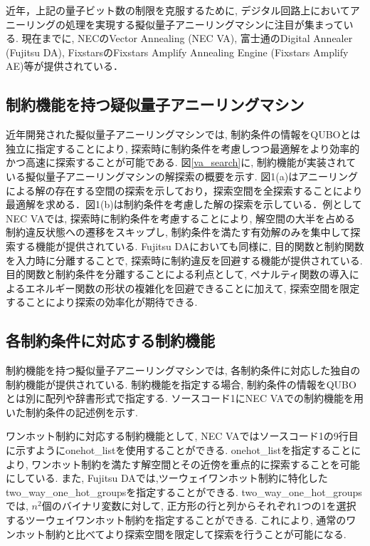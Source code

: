 \documentclass[submit,techrep,noauthor]{ipsj}
\begin{document}
近年，上記の量子ビット数の制限を克服するために, デジタル回路上においてアニーリングの処理を実現する擬似量子アニーリングマシンに注目が集まっている. 現在までに, NECのVector Annealing (NEC VA)\cite{va}, 富士通のDigital Annealer (Fujitsu DA)\cite{da}, FixstarsのFixstars Amplify Annealing Engine (Fixstars Amplify AE)\cite{amplify}等が提供されている．

\subsection{制約機能を持つ疑似量子アニーリングマシン}
近年開発された擬似量子アニーリングマシンでは, 制約条件の情報をQUBOとは独立に指定することにより, 探索時に制約条件を考慮しつつ最適解をより効率的かつ高速に探索することが可能である. 図\ref{va_search}に, 制約機能が実装されている擬似量子アニーリングマシンの解探索の概要を示す. 図1(a)はアニーリングによる解の存在する空間の探索を示しており，探索空間を全探索することにより最適解を求める．図1(b)は制約条件を考慮した解の探索を示している．例としてNEC VAでは, 探索時に制約条件を考慮することにより, 解空間の大半を占める制約違反状態への遷移をスキップし, 制約条件を満たす有効解のみを集中して探索する機能が提供されている. Fujitsu DAにおいても同様に, 目的関数と制約関数を入力時に分離することで, 探索時に制約違反を回避する機能が提供されている. 目的関数と制約条件を分離することによる利点として, ペナルティ関数の導入によるエネルギー関数の形状の複雑化を回避できることに加えて, 探索空間を限定することにより探索の効率化が期待できる.

\subsection{各制約条件に対応する制約機能}
制約機能を持つ擬似量子アニーリングマシンでは, 各制約条件に対応した独自の制約機能が提供されている. 制約機能を指定する場合, 制約条件の情報をQUBOとは別に配列や辞書形式で指定する. ソースコード1にNEC VAでの制約機能を用いた制約条件の記述例を示す.

ワンホット制約に対応する制約機能として, NEC VAではソースコード1の9行目に示すようにonehot\_listを使用することができる. onehot\_listを指定することにより, ワンホット制約を満たす解空間とその近傍を重点的に探索することを可能にしている. また, Fujitsu DAでは,ツーウェイワンホット制約に特化したtwo\_way\_one\_hot\_groupsを指定することができる. two\_way\_one\_hot\_groupsでは, $n^{2}$個のバイナリ変数に対して, 正方形の行と列からそれぞれ1つの1を選択するツーウェイワンホット制約を指定することができる. これにより, 通常のワンホット制約と比べてより探索空間を限定して探索を行うことが可能になる\cite{komatsu2}.
\end{document}
